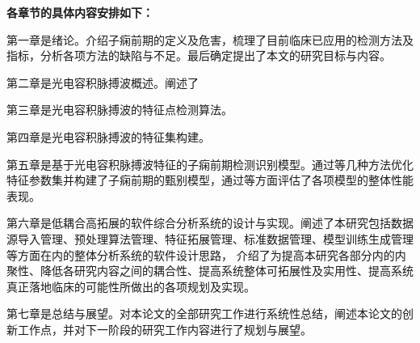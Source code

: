 \textbf{各章节的具体内容安排如下：}

第一章是绪论。介绍子痫前期的定义及危害，梳理了目前临床已应用的检测方法及指标，分析各项方法的缺陷与不足。最后确定提出了本文的研究目标与内容。

第二章是光电容积脉搏波概述。阐述了

第三章是光电容积脉搏波的特征点检测算法。

第四章是光电容积脉搏波的特征集构建。

第五章是基于光电容积脉搏波特征的子痫前期检测识别模型。通过等几种方法优化特征参数集并构建了子痫前期的甄别模型，通过等方面评估了各项模型的整体性能表现。

第六章是低耦合高拓展的软件综合分析系统的设计与实现。阐述了本研究包括数据源导入管理、预处理算法管理、特征拓展管理、标准数据管理、模型训练生成管理等方面在内的整体分析系统的软件设计思路，
介绍了为提高本研究各部分内的内聚性、降低各研究内容之间的耦合性、提高系统整体可拓展性及实用性、提高系统真正落地临床的可能性所做出的各项规划及实现。

第七章是总结与展望。对本论文的全部研究工作进行系统性总结，阐述本论文的创新工作点，并对下一阶段的研究工作内容进行了规划与展望。